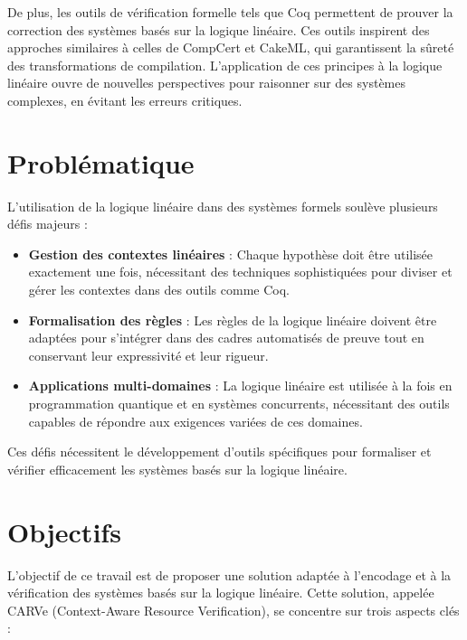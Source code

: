 De plus, les outils de vérification formelle tels que Coq permettent de prouver la correction des systèmes basés sur la logique linéaire. Ces outils inspirent des approches similaires à celles de CompCert et CakeML, qui garantissent la sûreté des transformations de compilation. L'application de ces principes à la logique linéaire ouvre de nouvelles perspectives pour raisonner sur des systèmes complexes, en évitant les erreurs critiques.

\section{Problématique}

L'utilisation de la logique linéaire dans des systèmes formels soulève plusieurs défis majeurs :

\begin{itemize}
    \item \textbf{Gestion des contextes linéaires} : Chaque hypothèse doit être utilisée exactement une fois, nécessitant des techniques sophistiquées pour diviser et gérer les contextes dans des outils comme Coq.
    \item \textbf{Formalisation des règles} : Les règles de la logique linéaire doivent être adaptées pour s'intégrer dans des cadres automatisés de preuve tout en conservant leur expressivité et leur rigueur.
    \item \textbf{Applications multi-domaines} : La logique linéaire est utilisée à la fois en programmation quantique et en systèmes concurrents, nécessitant des outils capables de répondre aux exigences variées de ces domaines.
\end{itemize}

Ces défis nécessitent le développement d'outils spécifiques pour formaliser et vérifier efficacement les systèmes basés sur la logique linéaire.

\section{Objectifs}

L'objectif de ce travail est de proposer une solution adaptée à l'encodage et à la vérification des systèmes basés sur la logique linéaire. Cette solution, appelée CARVe (Context-Aware Resource Verification), se concentre sur trois aspects clés :

